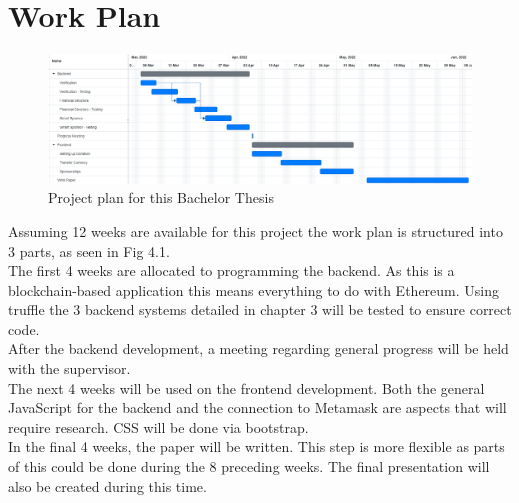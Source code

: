 \chapter{Work Plan}
\begin{figure}
    \includegraphics[width=1 \textwidth]{figures/timeplan.PNG}  
    \caption{Project plan for this Bachelor Thesis}
    \label{fig:timeplan}
\end{figure}
Assuming 12 weeks are available for this project the work plan is structured into 3 parts, as seen in Fig 4.1.\\
The first 4 weeks are allocated to programming the backend. As this is a blockchain-based application this means everything to do with Ethereum. Using truffle the 3 backend systems detailed in chapter 3 will be tested to ensure correct code.\\
After the backend development, a meeting regarding general progress will be held with the supervisor.\\
The next 4 weeks will be used on the frontend development. Both the general JavaScript for the backend and the connection to Metamask are aspects that will require research. CSS will be done via bootstrap.\\
In the final 4 weeks, the paper will be written. This step is more flexible as parts of this could be done during the 8 preceding weeks. The final presentation will also be created during this time.